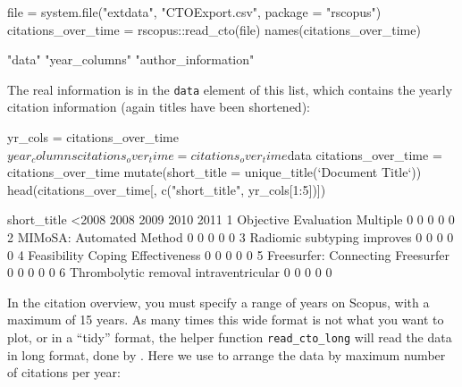 \begin{Schunk}
\begin{Sinput}
file = system.file("extdata", "CTOExport.csv", package = "rscopus")
citations_over_time = rscopus::read_cto(file)
names(citations_over_time)
\end{Sinput}
\begin{Soutput}
[1] "data"               "year_columns"       "author_information"
\end{Soutput}
\end{Schunk}

The real information is in the \texttt{data} element of this list, which
contains the yearly citation information (again titles have been
shortened):

\begin{Schunk}
\begin{Sinput}
yr_cols = citations_over_time$year_columns
citations_over_time = citations_over_time$data
citations_over_time = citations_over_time %>% 
  mutate(short_title = unique_title(`Document Title`))
head(citations_over_time[, c("short_title", yr_cols[1:5])])
\end{Sinput}
\begin{Soutput}
                            short_title <2008 2008 2009 2010 2011
1         Objective Evaluation Multiple     0    0    0    0    0
2              MIMoSA: Automated Method     0    0    0    0    0
3           Radiomic subtyping improves     0    0    0    0    0
4      Feasibility Coping Effectiveness     0    0    0    0    0
5     Freesurfer: Connecting Freesurfer     0    0    0    0    0
6 Thrombolytic removal intraventricular     0    0    0    0    0
\end{Soutput}
\end{Schunk}

In the citation overview, you must specify a range of years on Scopus,
with a maximum of 15 years. As many times this wide format is not what
you want to plot, or in a ``tidy'' format, the  helper
function \texttt{read\_cto\_long} will read the data in long format,
done by  \citep{tidyr}. Here we use  to arrange
the data by maximum number of citations per year:

